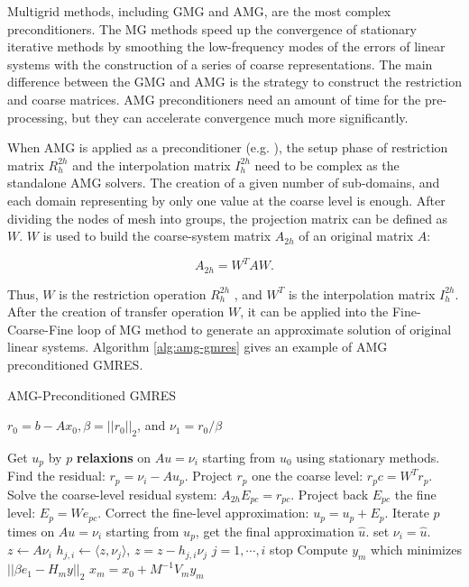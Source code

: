 {Multigrid methods, including GMG and AMG, are the most complex preconditioners. The MG methods speed up the convergence of stationary iterative methods by smoothing the low-frequency modes of the errors of linear systems with the construction of a series of coarse representations. The main difference between the GMG and AMG is the strategy to construct the restriction and coarse matrices. AMG preconditioners need an amount of time for the pre-processing, but they can accelerate convergence much more significantly.

When AMG is applied as a preconditioner (e.g. \cite{plank2007algebraic,leem2004algebraic,yang2002boomeramg,mifune2003new}), the setup phase of restriction matrix $R_h^{2h}$ and the interpolation matrix $I_h^{2h}$ need to be complex as the standalone AMG solvers. The creation of a given number of sub-domains, and each domain representing by only one value at the coarse level is enough. After dividing the nodes of mesh into groups, the projection matrix can be defined as $W$. $W$ is used to build the coarse-system matrix $A_{2h}$ of an original matrix $A$:

\begin{equation}
A_{2h}=W^{T}AW.
\end{equation}

Thus, $W$ is the restriction operation $R_h^{2h}$ , and $W^{T}$ is the interpolation matrix $I_h^{2h}$. After the creation of transfer operation $W$, it can be applied into the Fine-Coarse-Fine loop of MG method to generate an approximate solution of original linear systems. Algorithm \ref{alg:amg-gmres} gives an example of AMG preconditioned GMRES.

\begin{algorithm}[htbp]
	\caption{AMG-Preconditioned GMRES}
	\label{alg:amg-gmres}
	\begin{algorithmic}[1]
		\State $r_0=b-A x_0, \beta=||r_0||_2$, and $\nu_1=r_0/\beta$
		
		\State Get $u_p$ by $p$ \textbf{relaxions} on $Au=\nu_i$ starting from $u_0$ using stationary methods.
		\State Find the residual: $r_p=\nu_i - Au_p$.
		\State Project $r_p$ one the coarse level: $r_pc=W^Tr_p$.
		\State Solve the coarse-level residual system: $A_{2h}E_{pc}=r_{pc}$.
		\State Project back $E_{pc}$ the fine level: $E_p = We_{pc}$.
		\State Correct the fine-level approximation: $u_p=u_p+E_p$.
		\State Iterate $p$ times on $Au=\nu_i$ starting from $u_p$, get the final approximation $\hat{u}$.
		\State set $\nu_i = \hat{u}$.
		\State $z \leftarrow A\nu_i$
		\State $h_{j,i} \leftarrow \langle z,\nu_j\rangle$, $z = z- h_{j,i}\nu_j$ $j=1,\cdots,i$
		\State stop
		\Else
		\EndIf
		\EndFor
		\State Compute $y_m$ which minimizes $||\beta e_1-H_m y||_2$ 
		\State $x_m=x_0+M^{-1}V_my_m$
	\end{algorithmic}
\end{algorithm}

}
